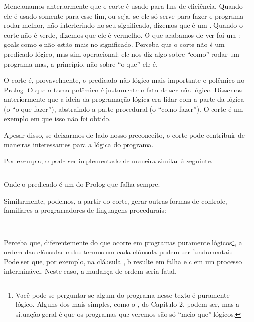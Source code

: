 \documentclass{article}
\begin{document}
Mencionamos anteriormente que o corte é usado para fins de eficiência. Quando ele é usado somente para esse fim, ou seja, se ele só serve para fazer o programa rodar melhor, não interferindo no seu significado, dizemos que é um .
Quando o corte não é verde, dizemos que ele é vermelho. O que acabamos de ver foi um : goals como  e  não estão mais no significado. Perceba que o corte não é um predicado lógico, mas sim operacional: ele nos diz algo sobre ``como'' rodar um programa mas, a princípio, não sobre ``o que'' ele é.

O corte é, provavelmente, o predicado não lógico mais importante e polêmico no Prolog. O que o torna polêmico é justamente o fato de ser não lógico. Dissemos anteriormente que a ideia da programação lógica era lidar com a parte da lógica (o ``o que fazer''), abstraindo a parte procedural (o ``como fazer''). O corte é um exemplo em que isso não foi obtido.

Apesar disso, se deixarmos de lado nosso preconceito, o corte pode contribuir de maneiras interessantes para a lógica do programa.

Por exemplo, o  pode ser implementado de maneira similar à seguinte:

\inputminted{prolog}{../Exemplos/Cap4/prog3_not.pl}

Onde o predicado  é um  do Prolog que falha sempre.

Similarmente, podemos, a partir do corte, gerar outras formas de controle, familiares a programadores de linguagens procedurais:

\inputminted{prolog}{../Exemplos/Cap4/prog4_ifthenelse.pl}

\inputminted{prolog}{../Exemplos/Cap4/prog5_or.pl}

Perceba que, diferentemente do que ocorre em programas puramente lógicos\footnote{Você pode se perguntar se algum do programa nesse texto é puramente lógico. Alguns dos mais simples, como o , do Capítulo 2, %
podem ser, mas a situação geral é que os programas que veremos são só ``meio que'' lógicos.}, a ordem das cláusulas e dos termos em cada cláusula podem ser fundamentais. Pode ser que, por exemplo, na cláusula , b resulte em falha e c em um
processo interminável. Neste caso, a mudança de ordem seria fatal.
\end{document}
